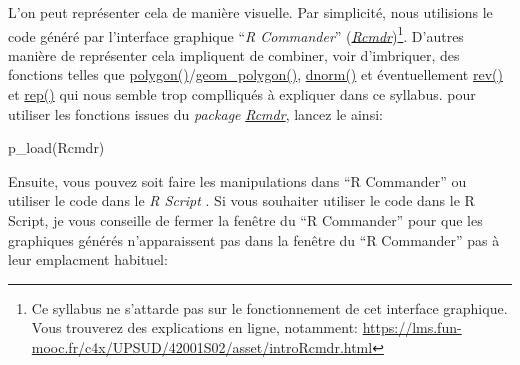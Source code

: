 \documentclass[
]{book}
\newenvironment{Shaded}{\begin{snugshade}}{\end{snugshade}}
\newcommand{\FunctionTok}[1]{\textcolor[rgb]{0.00,0.00,0.00}{#1}}
\newcommand{\NormalTok}[1]{#1}
\begin{document}
L'on peut représenter cela de manière visuelle. Par simplicité, nous utilisions le code généré par l'interface graphique ``\emph{R Commander}'' (\href{https://cran.r-project.org/web/packages/Rcmdr/index.html}{\emph{Rcmdr}})\footnote{Ce syllabus ne s'attarde pas sur le fonctionnement de cet interface graphique. Vous trouverez des explications en ligne, notamment: \url{https://lms.fun-mooc.fr/c4x/UPSUD/42001S02/asset/introRcmdr.html}}. D'autres manière de représenter cela impliquent de combiner, voir d'imbriquer, des fonctions telles que \href{https://www.rdocumentation.org/packages/graphics/versions/3.6.2/topics/polygon}{polygon()}/\href{https://ggplot2.tidyverse.org/reference/geom_polygon.html}{geom\_polygon()}, \href{https://stat.ethz.ch/R-manual/R-devel/library/stats/html/Normal.html}{dnorm()} et éventuellement \href{https://www.rdocumentation.org/packages/base/versions/3.6.2/topics/rev}{rev()} et \href{https://www.rdocumentation.org/packages/base/versions/3.6.2/topics/rep}{rep()} qui nous semble trop complliqués à expliquer dans ce syllabus. pour utiliser les fonctions issues du \emph{package} \href{https://cran.r-project.org/web/packages/Rcmdr/index.html}{\emph{Rcmdr}}, lancez le ainsi:

\begin{Shaded}
\begin{Highlighting}[]
\FunctionTok{p\_load}\NormalTok{(Rcmdr)}
\end{Highlighting}
\end{Shaded}

Ensuite, vous pouvez soit faire les manipulations dans ``R Commander'' ou utiliser le code dans le \emph{R Script }. Si vous souhaiter utiliser le code dans le R Script, je vous conseille de fermer la fenêtre du ``R Commander'' pour que les graphiques générés n'apparaissent pas dans la fenêtre du ``R Commander'' pas à leur emplacment habituel:
\end{document}
